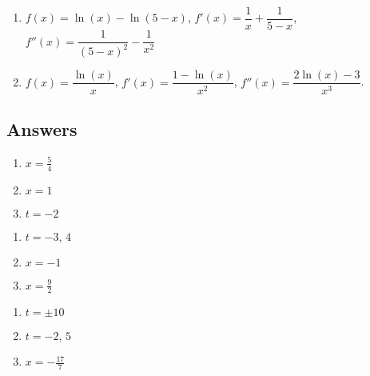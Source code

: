 \documentclass{ximera}
\begin{document}
\begin{enumerate}
\setcounter{enumi}{\value{HW}}

\item\label{logcurvesketchfirst}  $f(x) = \ln(x) - \ln(5-x)$,  $f'(x) = \dfrac{1}{x} + \dfrac{1}{5-x}$, $f''(x) = \dfrac{1}{(5-x)^2} - \dfrac{1}{x^2}$

\smallskip

\item\label{logcurvesketchlast}  $f(x) = \dfrac{\ln(x)}{x}$, $f'(x) = \dfrac{1 - \ln(x)}{x^2}$, $f''(x) = \dfrac{2 \ln(x) - 3}{x^3}$.


\setcounter{HW}{\value{enumi}}
\end{enumerate}



\newpage

\subsection{Answers}
\begin{enumerate}

\item $x = \frac{5}{4}$
\item $x = 1$
\item $t=-2$

\setcounter{HW}{\value{enumi}}
\end{enumerate}

\begin{enumerate}
\setcounter{enumi}{\value{HW}}

\item $t=-3,\, 4$
\item $x=-1$
\item $x=\frac{9}{2}$

\setcounter{HW}{\value{enumi}}
\end{enumerate}

\begin{enumerate}
\setcounter{enumi}{\value{HW}}

\item $t=\pm 10$
\item $t=-2,\, 5$
\item $x = -\frac{17}{7}$

\setcounter{HW}{\value{enumi}}
\end{enumerate}
\end{document}
